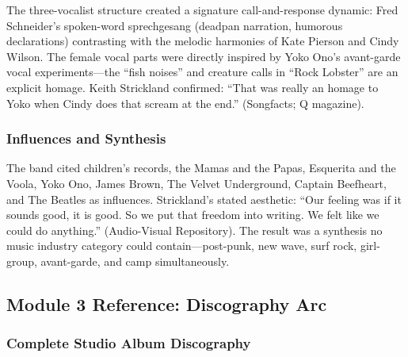\documentclass[11pt,letterpaper]{article}
\begin{document}
The three-vocalist structure created a signature call-and-response dynamic: Fred Schneider's spoken-word sprechgesang (deadpan narration, humorous declarations) contrasting with the melodic harmonies of Kate Pierson and Cindy Wilson. The female vocal parts were directly inspired by Yoko Ono's avant-garde vocal experiments---the ``fish noises'' and creature calls in ``Rock Lobster'' are an explicit homage. Keith Strickland confirmed: ``That was really an homage to Yoko when Cindy does that scream at the end.'' (Songfacts; Q magazine).

\subsubsection{Influences and Synthesis}

The band cited children's records, the Mamas and the Papas, Esquerita and the Voola, Yoko Ono, James Brown, The Velvet Underground, Captain Beefheart, and The Beatles as influences. Strickland's stated aesthetic: ``Our feeling was if it sounds good, it is good. So we put that freedom into writing. We felt like we could do anything.'' (Audio-Visual Repository). The result was a synthesis no music industry category could contain---post-punk, new wave, surf rock, girl-group, avant-garde, and camp simultaneously.

\subsection{Module 3 Reference: Discography Arc}

\subsubsection{Complete Studio Album Discography}
\end{document}
